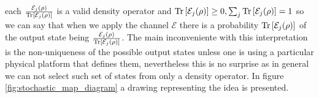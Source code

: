 each $\frac{\mathcal{E}_{j}(\rho)}{\mathrm{Tr}\left[\mathcal{E}_{j}(\rho)\right]}$ is a valid density operator and $\mathrm{Tr}\left[\mathcal{E}_{j}(\rho)\right]\geq 0,
\sum_{j}\mathrm{Tr}\left[\mathcal{E}_{j}(\rho)\right]=1$ so we can say that when we apply the channel $\mathcal{E}$ there is a probability
$\mathrm{Tr}\left[\mathcal{E}_{j}(\rho)\right]$ of the output state being $\frac{\mathcal{E}_{j}(\rho)}{\mathrm{Tr}\left[\mathcal{E}_{j}(\rho)\right]}$. The main inconveniente
with this interpretation is the non-uniqueness of the possible output states unless one is using a particular physical platform that
defines them, nevertheless this is no surprise as in general we can not select such set of states from only a density operator. In figure
\ref{fig:stochastic_map_diagram} a drawing representing the idea is presented.


